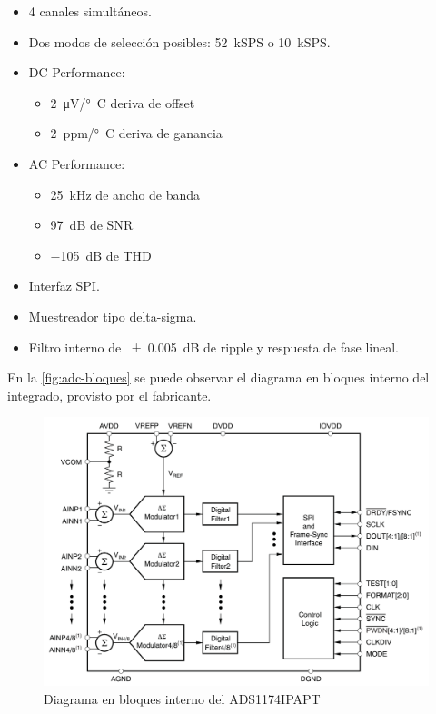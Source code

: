 \documentclass[../et.tex]{subfiles}
\begin{document}
\begin{itemize}
  \item 4 canales simultáneos.
  \item Dos modos de selección posibles: \SI{52}{kSPS} o \SI{10}{kSPS}.
  \item DC Performance:
    \begin{itemize}
      \item \SI{2}{\micro V/\degree C} deriva de offset
      \item \SI{2}{ppm/\degree C} deriva de ganancia
    \end{itemize}

    \item AC Performance:
      \begin{itemize}
        \item \SI{25}{kHz} de ancho de banda
        \item \SI{97}{dB} de SNR
        \item \SI{-105}{dB} de THD
      \end{itemize}
  \item Interfaz SPI.
  \item Muestreador tipo delta-sigma.
  \item Filtro interno de \SI{\pm 0.005}{dB} de ripple y respuesta de fase lineal.
\end{itemize}

En la \autoref{fig:adc-bloques} se puede observar el diagrama en bloques interno del integrado, provisto por el fabricante.

\begin{figure}[!htbp]
  \centering
  \includegraphics[scale=0.4]{../images/adc-bloques.png}
  \caption{Diagrama en bloques interno del ADS1174IPAPT}
  \label{fig:adc-bloques}
\end{figure}
\end{document}

